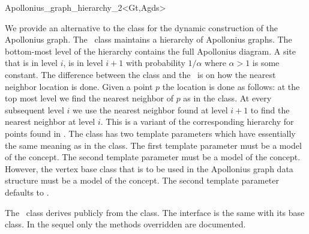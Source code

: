 
\begin{ccRefClass}{Apollonius_graph_hierarchy_2<Gt,Agds>}

\ccDefinition

We provide an alternative to the class
 for the dynamic
construction of the Apollonius graph. The \ccRefName\ class maintains
a hierarchy of Apollonius graphs. The bottom-most level of the
hierarchy contains the full Apollonius diagram. A site that
is in level $i$, is in level $i+1$ with probability $1/\alpha$
where $\alpha > 1$ is some constant. The difference between the
 class and the
\ccRefName\ is on how the nearest neighbor location is done. Given a
point $p$ the location is done as follows: at the top most level we
find the nearest neighbor of $p$ as in the
 class. At every subsequent level $i$
we use the nearest neighbor found at level $i+1$ to find the nearest
neighbor at level $i$. This is a variant of the corresponding
hierarchy for points found in \cite{d-iirdt-98}.
%
The class has two template parameters which have essentially the same
meaning as in the  class. The first
template parameter must be a model of the
 concept.
The second template parameter must be a model of the
 concept. However, the vertex base
class that is to be used in the Apollonius graph data structure must
be a model of the  concept.
The second template parameter defaults to
. 

The \ccRefName\ class derives publicly from the
 class. The interface is
the same with its base class. In the sequel only the methods
overridden are documented.



\end{ccRefClass}
